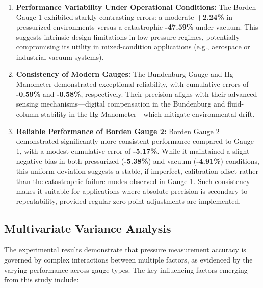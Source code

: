 \documentclass{article}
\begin{document}
\begin{enumerate}  
	\item \textbf{Performance Variability Under Operational Conditions:}  
	The Borden Gauge 1 exhibited starkly contrasting errors: a moderate \textbf{+2.24\%} in pressurized environments versus a catastrophic \textbf{-47.59\%} under vacuum. This suggests intrinsic design limitations in low-pressure regimes, potentially compromising its utility in mixed-condition applications (e.g., aerospace or industrial vacuum systems).  
	
	\item \textbf{Consistency of Modern Gauges:}  
	The Bundenburg Gauge and Hg Manometer demonstrated exceptional reliability, with cumulative errors of \textbf{-0.59\%} and \textbf{-0.58\%}, respectively. Their precision aligns with their advanced sensing mechanisms---digital compensation in the Bundenburg and fluid-column stability in the Hg Manometer—which mitigate environmental drift.  
	
	\item \textbf{Reliable Performance of Borden Gauge 2:}  
	Borden Gauge 2 demonstrated significantly more consistent performance compared to Gauge 1, with a modest cumulative error of \textbf{-5.17\%}. While it maintained a slight negative bias in both pressurized (\textbf{-5.38\%}) and vacuum (\textbf{-4.91\%}) conditions, this uniform deviation suggests a stable, if imperfect, calibration offset rather than the catastrophic failure modes observed in Gauge 1. Such consistency makes it suitable for applications where absolute precision is secondary to repeatability, provided regular zero-point adjustments are implemented.
\end{enumerate}  

\subsection{Multivariate Variance Analysis}
The experimental results demonstrate that pressure measurement accuracy is governed by complex interactions between multiple factors, as evidenced by the varying performance across gauge types. The key influencing factors emerging from this study include:
\end{document}
